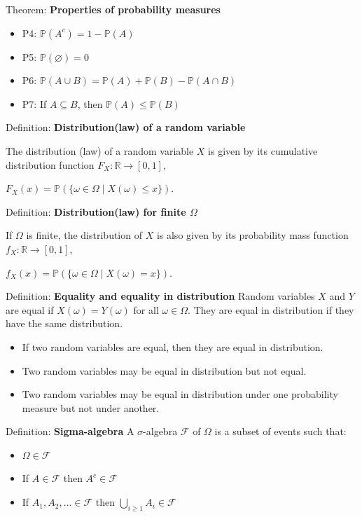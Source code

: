 \documentclass[12pt,a4paper]{article}
\begin{document}
Theorem: \textbf{Properties of probability measures}
\begin{itemize}
	\item P4: $\mathbb{P}(A^c) = 1 - \mathbb{P}(A)$
	\item P5: $\mathbb{P}(\varnothing) = 0$
	\item P6: $\mathbb{P}(A \cup B) = \mathbb{P}(A) + \mathbb{P}(B) - \mathbb{P}(A \cap B)$
	\item P7: If $A \subseteq B$, then $\mathbb{P}(A) \leq \mathbb{P}(B)$
\end{itemize}

Definition: \textbf{Distribution(law) of a random variable}

The distribution (law) of a random variable $X$ is given by its cumulative distribution function $F_X : \mathbb{R} \to [0,1]$,

$F_X(x) = \mathbb{P}(\{\omega \in \Omega \mid X(\omega) \leq x\})$.

Definition: \textbf{Distribution(law) for finite $\Omega$}

If $\Omega$ is finite, the distribution of $X$ is also given by its probability mass function $f_X : \mathbb{R} \to [0,1]$,

$f_X(x) = \mathbb{P}(\{\omega \in \Omega \mid X(\omega) = x\})$.

\vspace{1em}

Definition: \textbf{Equality and equality in distribution}
\vspace{0.5em}
Random variables $X$ and $Y$ are equal if $X(\omega) = Y(\omega)$ for all $\omega \in \Omega$.
They are equal in distribution if they have the same distribution.
\vspace{0.5em}
\begin{itemize}
	\item If two random variables are equal, then they are equal in distribution.
	\item Two random variables may be equal in distribution but not equal.
	\item Two random variables may be equal in distribution under one probability measure but not under another.
\end{itemize}
\vspace{1em}


Definition: \textbf{Sigma-algebra}
\vspace{0.5em}
A $\sigma$-algebra $\mathcal{F}$ of $\Omega$ is a subset of events such that:
\begin{itemize}
	\item[T1:] $\Omega \in \mathcal{F}$
	\item[T2:] If $A \in \mathcal{F}$ then $A^c \in \mathcal{F}$
	\item[T3:] If $A_1, A_2, \ldots \in \mathcal{F}$ then $\bigcup_{i \geq 1} A_i \in \mathcal{F}$
\end{itemize}
\end{document}
